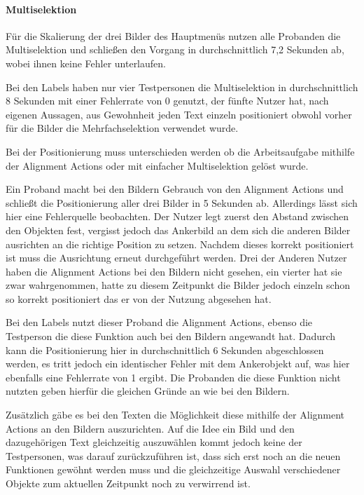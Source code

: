 \paragraph{Multiselektion}
Für die Skalierung der drei Bilder des Hauptmenüs nutzen alle Probanden die Multiselektion und schließen den Vorgang in durchschnittlich 7,2 Sekunden ab, wobei ihnen keine Fehler unterlaufen.

Bei den Labels haben nur vier Testpersonen die Multiselektion in durchschnittlich 8 Sekunden mit einer Fehlerrate von 0 genutzt, der fünfte Nutzer hat, nach eigenen Aussagen, aus Gewohnheit jeden Text einzeln positioniert obwohl vorher für die Bilder die Mehrfachselektion verwendet wurde.

Bei der Positionierung muss unterschieden werden ob die Arbeitsaufgabe mithilfe der Alignment Actions oder mit einfacher Multiselektion gelöst wurde.

Ein Proband macht bei den Bildern Gebrauch von den Alignment Actions und schließt die Positionierung aller drei Bilder in 5 Sekunden ab.
Allerdings lässt sich hier eine Fehlerquelle beobachten.
Der Nutzer legt zuerst den Abstand zwischen den Objekten fest, vergisst jedoch das Ankerbild an dem sich die anderen Bilder ausrichten an die richtige Position zu setzen.
Nachdem dieses korrekt positioniert ist muss die Ausrichtung erneut durchgeführt werden.
Drei der Anderen Nutzer haben die Alignment Actions bei den Bildern nicht gesehen, ein vierter hat sie zwar wahrgenommen, hatte zu diesem Zeitpunkt die Bilder jedoch einzeln schon so korrekt positioniert das er von der Nutzung abgesehen hat.

Bei den Labels nutzt dieser Proband die Alignment Actions, ebenso die Testperson die diese Funktion auch bei den Bildern angewandt hat.
Dadurch kann die Positionierung hier in durchschnittlich 6 Sekunden abgeschlossen werden, es tritt jedoch ein identischer Fehler mit dem Ankerobjekt auf, was hier ebenfalls eine Fehlerrate von 1 ergibt.
Die Probanden die diese Funktion nicht nutzten geben hierfür die gleichen Gründe an wie bei den Bildern.

Zusätzlich gäbe es bei den Texten die Möglichkeit diese mithilfe der Alignment Actions an den Bildern auszurichten.
Auf die Idee ein Bild und den dazugehörigen Text gleichzeitig auszuwählen kommt jedoch keine der Testpersonen, was darauf zurückzuführen ist, dass sich erst noch an die neuen Funktionen gewöhnt werden muss und die gleichzeitige Auswahl verschiedener Objekte zum aktuellen Zeitpunkt noch zu verwirrend ist.

